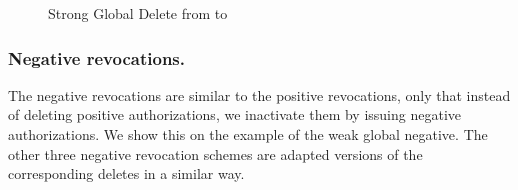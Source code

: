 \documentclass[runningheads]{llncs}
\begin{document}
\vspace{-3mm}
\begin{figure}[H]
\center
{}
\caption{Strong Global Delete from  to }
\end{figure}
\vspace{-7mm}

\subsubsection{Negative revocations.}
The negative revocations are similar to the positive revocations, only that instead of deleting positive authorizations, we inactivate them by issuing negative authorizations. We show this on the example of the weak global negative. The other three negative revocation schemes are adapted versions of the corresponding deletes in a similar way. 
\end{document}

